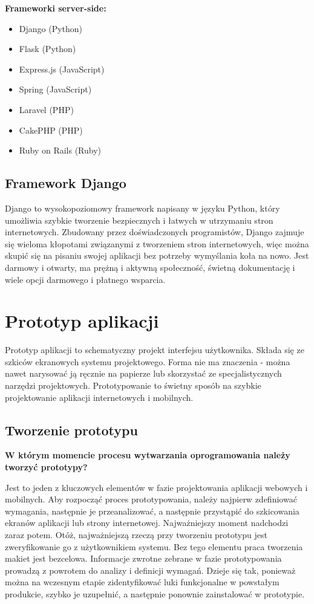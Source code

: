 \textbf{Frameworki server-side:}
\begin{itemize}
\item Django (Python)
\item Flask (Python)
\item Express.js (JavaScript)
\item Spring (JavaScript)
\item Laravel (PHP)
\item CakePHP (PHP)
\item Ruby on Rails (Ruby)
\end{itemize}

\subsection{Framework Django}

Django to wysokopoziomowy framework napisany w języku Python, który umożliwia szybkie tworzenie bezpiecznych i łatwych w utrzymaniu stron internetowych. Zbudowany przez doświadczonych programistów, Django zajmuje się wieloma kłopotami związanymi z tworzeniem stron internetowych, więc można skupić się na pisaniu swojej aplikacji bez potrzeby wymyślania koła na nowo. Jest darmowy i otwarty, ma prężną i aktywną społeczność, świetną dokumentację i wiele opcji darmowego i płatnego wsparcia.

\section{Prototyp aplikacji}

Prototyp aplikacji to schematyczny projekt interfejsu użytkownika. Składa się ze szkiców ekranowych systemu projektowego. Forma nie ma znaczenia - można nawet narysować ją ręcznie na papierze lub skorzystać ze specjalistycznych narzędzi projektowych. Prototypowanie to świetny sposób na szybkie projektowanie aplikacji internetowych i mobilnych.

\subsection{Tworzenie prototypu}

\textbf{W którym momencie procesu wytwarzania oprogramowania należy tworzyć prototypy?}

Jest to jeden z kluczowych elementów w fazie projektowania aplikacji webowych i mobilnych. Aby rozpocząć proces prototypowania, należy najpierw zdefiniować wymagania, następnie je przeanalizować, a następnie przystąpić do szkicowania ekranów aplikacji lub strony internetowej. Najważniejszy moment nadchodzi zaraz potem. Otóż, najważniejszą rzeczą przy tworzeniu prototypu jest zweryfikowanie go z użytkownikiem systemu. Bez tego elementu praca tworzenia makiet jest bezcelowa. Informacje zwrotne zebrane w fazie prototypowania prowadzą z powrotem do analizy i definicji wymagań. Dzieje się tak, ponieważ można na wczesnym etapie zidentyfikować luki funkcjonalne w powstałym produkcie, szybko je uzupełnić, a następnie ponownie zainstalować w prototypie.

